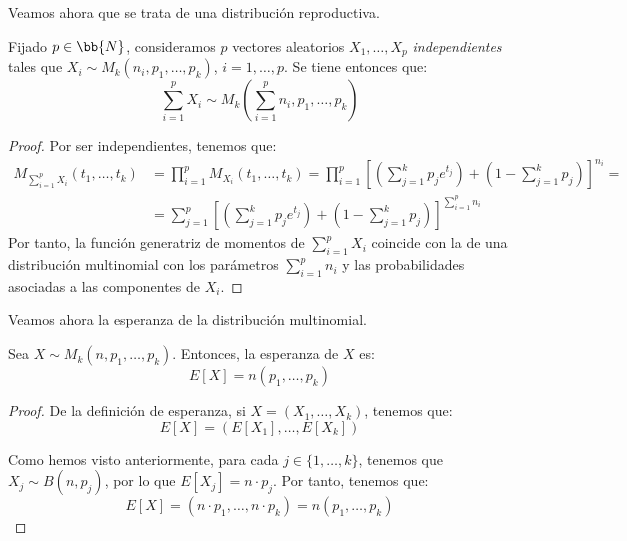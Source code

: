 Veamos ahora que se trata de una distribución reproductiva.
\begin{prop}
    Fijado $p\in \bb{N}$, consideramos $p$ vectores aleatorios $X_1, \ldots, X_p$ \emph{independientes} tales que $X_i\sim M_k(n_i, p_1, \ldots, p_k)$, $i=1, \ldots, p$. Se tiene entonces que:
    \begin{equation*}
        \sum_{i=1}^p X_i \sim M_k\left(\sum_{i=1}^p n_i, p_1, \ldots, p_k\right)
    \end{equation*}
\end{prop}
\begin{proof}
    Por ser independientes, tenemos que:
    \begin{align*}
        M_{\sum\limits_{i=1}^p X_i}(t_1, \ldots, t_k)&=\prod_{i=1}^p M_{X_i}(t_1, \ldots, t_k)=\prod_{i=1}^p \left[\left(\sum_{j=1}^k p_j e^{t_j}\right)+\left(1-\sum_{j=1}^k p_j\right)\right]^{n_i}
        =\\&= \sum_{j=1}^p \left[\left(\sum_{j=1}^k p_j e^{t_j}\right)+\left(1-\sum_{j=1}^k p_j\right)\right]^{\sum\limits_{i=1}^p n_i}
    \end{align*}
    Por tanto, la función generatriz de momentos de $\sum_{i=1}^p X_i$ coincide con la de una distribución multinomial con los parámetros $\sum_{i=1}^p n_i$ y las probabilidades asociadas a las componentes de $X_i$.
\end{proof}

Veamos ahora la esperanza de la distribución multinomial.
\begin{prop}
    Sea $X\sim M_k(n, p_1, \ldots, p_k)$. Entonces, la esperanza de $X$ es:
    \begin{equation*}
        E[X]=n\left(p_1, \ldots, p_k\right)
    \end{equation*}
\end{prop}
\begin{proof}
    De la definición de esperanza, si $X=(X_1, \ldots, X_k)$, tenemos que:
    \begin{equation*}
        E[X]=\left(E[X_1], \ldots, E[X_k]\right)
    \end{equation*}

    Como hemos visto anteriormente, para cada $j\in \{1, \ldots, k\}$, tenemos que $X_j\sim B(n, p_j)$, por lo que $E[X_j]=n\cdot p_j$. Por tanto, tenemos que:
    \begin{equation*}
        E[X]=\left(n\cdot p_1, \ldots, n\cdot p_k\right)=n\left(p_1, \ldots, p_k\right)
    \end{equation*}
\end{proof}

